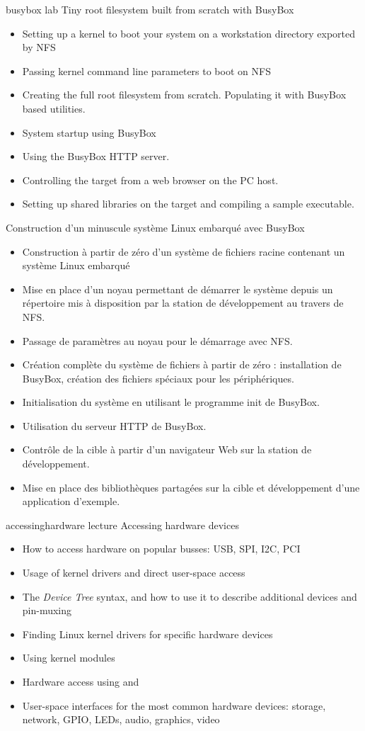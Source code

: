 {busybox}
{lab}
{Tiny root filesystem built from scratch with BusyBox}
{
  \begin{itemize}
  \item Setting up a kernel to boot your system on a workstation
    directory exported by NFS
  \item Passing kernel command line parameters to boot on NFS
  \item Creating the full root filesystem from scratch.
    Populating it with BusyBox based utilities.
  \item System startup using BusyBox 
  \item Using the BusyBox HTTP server.
  \item Controlling the target from a web browser on the PC host.
  \item Setting up shared libraries on the target and compiling
    a sample executable.
  \end{itemize}
}
{Construction d'un minuscule système Linux embarqué avec BusyBox}
{
  \begin{itemize}
  \item Construction à partir de zéro d'un système de fichiers racine
    contenant un système Linux embarqué
  \item Mise en place d'un noyau permettant de démarrer le système
    depuis un répertoire mis à disposition par la station de
    développement au travers de NFS.
  \item Passage de paramètres au noyau pour le démarrage avec NFS.
  \item Création complète du système de fichiers à partir de zéro :
    installation de BusyBox, création des fichiers spéciaux pour les
    périphériques.
  \item Initialisation du système en utilisant le programme init de BusyBox.
  \item Utilisation du serveur HTTP de BusyBox.
  \item Contrôle de la cible à partir d'un navigateur Web sur la
    station de développement.
  \item Mise en place des bibliothèques partagées sur la cible et
    développement d'une application d'exemple.
  \end{itemize}
}
{accessinghardware}
{lecture}
{Accessing hardware devices}
{
  \begin{itemize}
  \item How to access hardware on popular busses: USB, SPI, I2C, PCI
  \item Usage of kernel drivers and direct user-space access
  \item The {\em Device Tree} syntax, and how to use it to describe
    additional devices and pin-muxing
  \item Finding Linux kernel drivers for specific hardware devices
  \item Using kernel modules
  \item Hardware access using  and 
  \item User-space interfaces for the most common hardware devices:
    storage, network, GPIO, LEDs, audio, graphics, video
  \end{itemize}
}
